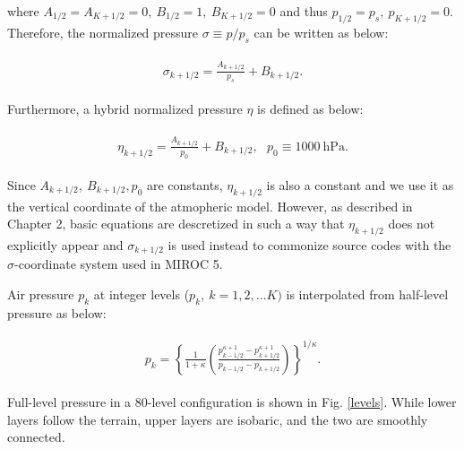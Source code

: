 where \(A_{1/2}=A_{K+1/2}=0,\ B_{1/2}=1,\ B_{K+1/2}=0\) and thus \(p_{1/2}=p_s,\ p_{K+1/2}=0\). Therefore, the normalized pressure \(\sigma\equiv p/p_s\) can be written as below:

\begin{eqnarray}
\begin{aligned}
\sigma_{k+1/2} = \frac{A_{k+1/2}}{p_s} +B_{k+1/2}.\end{aligned}
\end{eqnarray}

Furthermore, a hybrid normalized pressure \(\eta\) is defined as below:

\begin{eqnarray}
\begin{aligned}
\eta_{k+1/2} = \frac{A_{k+1/2}}{p_0} +B_{k+1/2},\ \ \ p_0\equiv 1000\ \mathrm{hPa}.
\end{aligned}
\end{eqnarray}

Since \(A_{k+1/2},\ B_{k+1/2}, p_0\) are constants, \(\eta_{k+1/2}\) is also a constant and we use it as the vertical coordinate of the atmopheric model. However, as described in Chapter 2, basic
equations are descretized in such a way that \(\eta_{k+1/2}\) does not explicitly appear and \(\sigma_{k+1/2}\) is used instead to commonize source codes with the \(\sigma\)-coordinate system used in
MIROC 5.

Air pressure \(p_k\) at integer levels (\(p_k,\ k=1,2,\ldots K)\) is interpolated from half-level pressure as below:

\begin{eqnarray}
\begin{aligned}
p_k = \left\{ \frac{1}{1+\kappa}
\left( \frac{  p^{\kappa +1}_{k-1/2}
- p^{\kappa +1}_{k+1/2}      }
{ p_{k-1/2} - p_{k+1/2} }
\right)
\right\}^{1/\kappa}.
\end{aligned}
\end{eqnarray}

Full-level pressure in a 80-level configuration is shown in Fig. \ref{levels}. While lower layers follow the terrain, upper layers are isobaric, and the two are smoothly connected.


